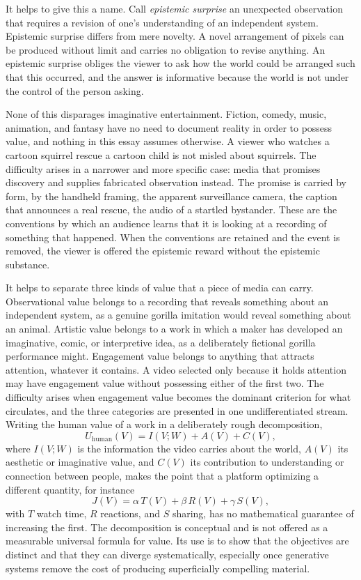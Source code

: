 \documentclass[12pt]{article}
\theoremstyle{plain}
\theoremstyle{definition}
\theoremstyle{remark}
\begin{document}
It helps to give this a name. Call \emph{epistemic surprise} an unexpected observation that requires a revision of one's understanding of an independent system. Epistemic surprise differs from mere novelty. A novel arrangement of pixels can be produced without limit and carries no obligation to revise anything. An epistemic surprise obliges the viewer to ask how the world could be arranged such that this occurred, and the answer is informative because the world is not under the control of the person asking.

None of this disparages imaginative entertainment. Fiction, comedy, music, animation, and fantasy have no need to document reality in order to possess value, and nothing in this essay assumes otherwise. A viewer who watches a cartoon squirrel rescue a cartoon child is not misled about squirrels. The difficulty arises in a narrower and more specific case: media that promises discovery and supplies fabricated observation instead. The promise is carried by form, by the handheld framing, the apparent surveillance camera, the caption that announces a real rescue, the audio of a startled bystander. These are the conventions by which an audience learns that it is looking at a recording of something that happened. When the conventions are retained and the event is removed, the viewer is offered the epistemic reward without the epistemic substance.

It helps to separate three kinds of value that a piece of media can carry. Observational value belongs to a recording that reveals something about an independent system, as a genuine gorilla imitation would reveal something about an animal. Artistic value belongs to a work in which a maker has developed an imaginative, comic, or interpretive idea, as a deliberately fictional gorilla performance might. Engagement value belongs to anything that attracts attention, whatever it contains. A video selected only because it holds attention may have engagement value without possessing either of the first two. The difficulty arises when engagement value becomes the dominant criterion for what circulates, and the three categories are presented in one undifferentiated stream. Writing the human value of a work in a deliberately rough decomposition,
\[
U_{\mathrm{human}}(V) = I(V;W) + A(V) + C(V),
\]
where $I(V;W)$ is the information the video carries about the world, $A(V)$ its aesthetic or imaginative value, and $C(V)$ its contribution to understanding or connection between people, makes the point that a platform optimizing a different quantity, for instance
\[
J(V) = \alpha\, T(V) + \beta\, R(V) + \gamma\, S(V),
\]
with $T$ watch time, $R$ reactions, and $S$ sharing, has no mathematical guarantee of increasing the first. The decomposition is conceptual and is not offered as a measurable universal formula for value. Its use is to show that the objectives are distinct and that they can diverge systematically, especially once generative systems remove the cost of producing superficially compelling material.
\end{document}
